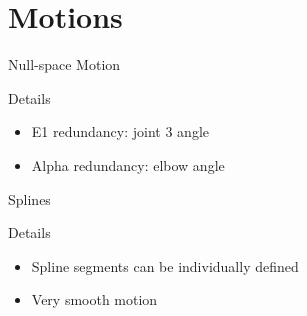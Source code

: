 \documentclass{beamer}
\begin{document}
\section{Motions}

\begin{frame}{Null-space Motion}

  \begin{block}{Details}
    \begin{itemize}
      \item E1 redundancy: joint 3 angle
      \item Alpha redundancy: elbow angle
    \end{itemize}
  \end{block}
\end{frame}

\begin{frame}{Splines}

  \begin{block}{Details}
    \begin{itemize}
      \item Spline segments can be individually defined
      \item Very smooth motion
    \end{itemize}
  \end{block}
\end{frame}
\end{document}
